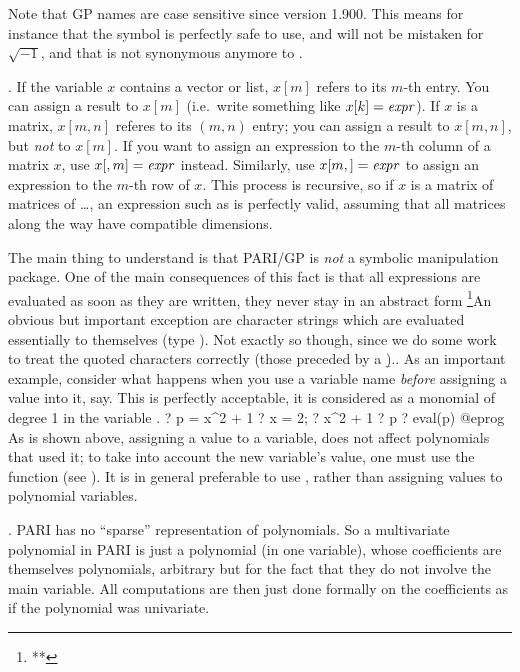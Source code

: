 Note that GP names are case sensitive since version 1.900. This means for
instance that the symbol  is perfectly safe to use, and will not be
mistaken for $\sqrt{-1}$, and that  is not synonymous anymore to
.

. If the variable $x$ contains a vector or list,
$x[m]$ refers to its $m$-th entry. You can assign a result to $x[m]$
(i.e.~write something like $x[k]=\hbox{\it expr\/}$). If $x$ is a matrix, $x[m,n]$
referes to its $(m,n)$ entry; you can assign a result to $x[m,n]$, but
\emph{not} to $x[m]$. If you want to assign an expression to the $m$-th
column of a matrix $x$, use $x[,m]=\hbox{\it expr\/}$ instead. Similarly, use
$x[m,]=\hbox{\it expr\/}$ to assign an expression to the $m$-th row of $x$. This
process is recursive, so if $x$ is a matrix of matrices of \dots, an
expression such as  is perfectly valid, assuming
that all matrices along the way have compatible dimensions.

  The main thing to understand is that PARI/GP is \emph{not} a symbolic
manipulation package. One of the main consequences of this fact is that all
expressions are evaluated as soon as they are written, they never stay in an
abstract form%
\footnote{**}{An obvious but important exception are character strings which
are evaluated essentially to themselves (type ). Not exactly
so though, since we do some work to treat the quoted characters correctly
(those preceded by a \b{)}.}.
%
As an important example, consider what happens when you use a variable name
\emph{before} assigning a value into it,  say. This is perfectly
acceptable, it is considered as a monomial of degree 1 in the variable
.
\bprog
  ? p = x^2 + 1
  ? x = 2;
  ? x^2 + 1
  ? p
  ? eval(p)
@eprog\noindent
As is shown above, assigning a value to a variable, does not affect
polynomials that used it; to take into account the new variable's value, one
must use the function  (see ). It is in general
preferable to use , rather than assigning values to polynomial
variables.

.\label{se:priority}
PARI has no ``sparse'' representation of polynomials. So a
multivariate polynomial in PARI is just a polynomial (in one variable), whose
coefficients are themselves polynomials, arbitrary but for the fact that they
do not involve the main variable. All computations are then just done
formally on the coefficients as if the polynomial was univariate.

